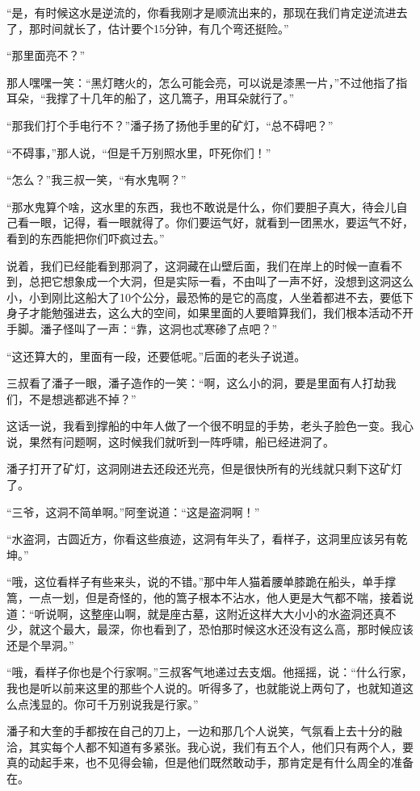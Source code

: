 “是，有时候这水是逆流的，你看我刚才是顺流出来的，那现在我们肯定逆流进去了，那时间就长了，估计要个15分钟，有几个弯还挺险。”

“那里面亮不？”

那人嘿嘿一笑：“黑灯瞎火的，怎么可能会亮，可以说是漆黑一片，”不过他指了指耳朵，“我撑了十几年的船了，这几篙子，用耳朵就行了。”

“那我们打个手电行不？”潘子扬了扬他手里的矿灯，“总不碍吧？”

“不碍事，”那人说，“但是千万别照水里，吓死你们！”

“怎么？”我三叔一笑，“有水鬼啊？”

“那水鬼算个啥，这水里的东西，我也不敢说是什么，你们要胆子真大，待会儿自己看一眼，记得，看一眼就得了。你们要运气好，就看到一团黑水，要运气不好，看到的东西能把你们吓疯过去。”

说着，我们已经能看到那洞了，这洞藏在山壁后面，我们在岸上的时候一直看不到，总把它想象成一个大洞，但是实际一看，不由叫了一声不好，没想到这洞这么小，小到刚比这船大了10个公分，最恐怖的是它的高度，人坐着都进不去，要低下身子才能勉强进去，这么大的空间，如果里面的人要暗算我们，我们根本活动不开手脚。潘子怪叫了一声：“靠，这洞也忒寒碜了点吧？”

“这还算大的，里面有一段，还要低呢。”后面的老头子说道。

三叔看了潘子一眼，潘子造作的一笑：“啊，这么小的洞，要是里面有人打劫我们，不是想逃都逃不掉？”

这话一说，我看到撑船的中年人做了一个很不明显的手势，老头子脸色一变。我心说，果然有问题啊，这时候我们就听到一阵呼啸，船已经进洞了。

潘子打开了矿灯，这洞刚进去还段还光亮，但是很快所有的光线就只剩下这矿灯了。

“三爷，这洞不简单啊。”阿奎说道：“这是盗洞啊！”

“水盗洞，古圆近方，你看这些痕迹，这洞有年头了，看样子，这洞里应该另有乾坤。”

“哦，这位看样子有些来头，说的不错。”那中年人猫着腰单膝跪在船头，单手撑篙，一点一划，但是奇怪的，他的篙子根本不沾水，他人更是大气都不喘，接着说道：“听说啊，这整座山啊，就是座古墓，这附近这样大大小小的水盗洞还真不少，就这个最大，最深，你也看到了，恐怕那时候这水还没有这么高，那时候应该还是个旱洞。”

“哦，看样子你也是个行家啊。”三叔客气地递过去支烟。他摇摇，说：“什么行家，我也是听以前来这里的那些个人说的。听得多了，也就能说上两句了，也就知道这么点浅显的。你可千万别说我是行家。”

潘子和大奎的手都按在自己的刀上，一边和那几个人说笑，气氛看上去十分的融洽，其实每个人都不知道有多紧张。我心说，我们有五个人，他们只有两个人，要真的动起手来，也不见得会输，但是他们既然敢动手，那肯定是有什么周全的准备在。

